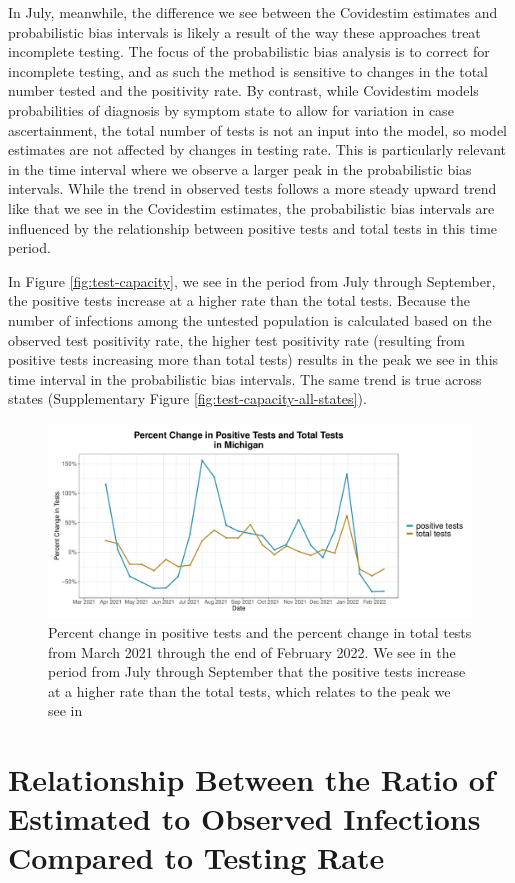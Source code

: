 \documentclass[12pt,twoside]{smiththesis}
\begin{document}
In July, meanwhile, the difference we see between the Covidestim estimates and probabilistic bias intervals is likely a result of the way these approaches treat incomplete testing. The focus of the probabilistic bias analysis is to correct for incomplete testing, and as such the method is sensitive to changes in the total number tested and the positivity rate. By contrast, while Covidestim models probabilities of diagnosis by symptom state to allow for variation in case ascertainment, the total number of tests is not an input into the model, so model estimates are not affected by changes in testing rate. This is particularly relevant in the time interval where we observe a larger peak in the probabilistic bias intervals. While the trend in observed tests follows a more steady upward trend like that we see in the Covidestim estimates, the probabilistic bias intervals are influenced by the relationship between positive tests and total tests in this time period.

In Figure \ref{fig:test-capacity}, we see in the period from July through September, the positive tests increase at a higher rate than the total tests. Because the number of infections among the untested population is calculated based on the observed test positivity rate, the higher test positivity rate (resulting from positive tests increasing more than total tests) results in the peak we see in this time interval in the probabilistic bias intervals. The same trend is true across states (Supplementary Figure \ref{fig:test-capacity-all-states}).
\begin{figure}
\includegraphics[width=1\linewidth]{figure/test_capacity} \caption{\label{fig:test-capacity} Percent change in positive tests and the percent change in total tests from March 2021 through the end of February 2022. We see in the period from July through September that the positive tests increase at a higher rate than the total tests, which relates to the peak we see in }\label{fig:unnamed-chunk-8}
\end{figure}
\hypertarget{relationship-between-the-ratio-of-estimated-to-observed-infections-compared-to-testing-rate}{%
\section{Relationship Between the Ratio of Estimated to Observed Infections Compared to Testing Rate}\label{relationship-between-the-ratio-of-estimated-to-observed-infections-compared-to-testing-rate}}
\end{document}
